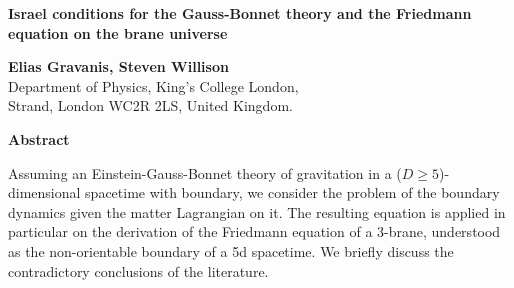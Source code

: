 \documentclass[a4paper,a4paper]{article}
\begin{document}
\begin{centering}

\vspace{0in}

{\Large {\bf Israel conditions for the Gauss-Bonnet theory and the Friedmann equation on 
the brane universe}}



\vspace{0.4in}



{ \bf Elias Gravanis, \; Steven Willison} \\
\vspace{0.2in}
Department of Physics, King's College London,\\
Strand, London WC2R 2LS, United Kingdom.



\vspace{0.2in}
 {\bf Abstract}

\end{centering}

\vspace{0.2in}

{\small Assuming an Einstein-Gauss-Bonnet theory of gravitation in a ($D \geq 5$)-dimensional spacetime
with boundary, we consider the problem of the boundary dynamics given the matter Lagrangian on it. The
resulting equation is applied in particular on the derivation of the Friedmann equation of a 3-brane, 
understood as the non-orientable boundary of a 5d spacetime. We briefly discuss the contradictory 
conclusions of the literature.}


\vspace{0.3in}
\end{document}
